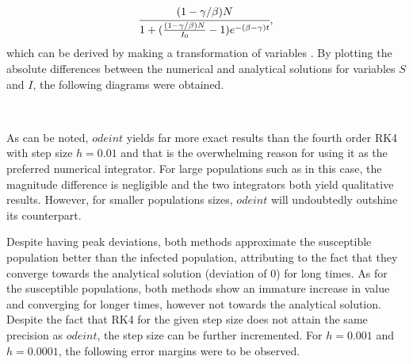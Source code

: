 \documentclass[12pt]{article}
\begin{document}
\begin{equation}
\cfrac{(1-\gamma/\beta)N}{1+(\frac{(1-\gamma/\beta)N}{I_0}-1)
e^{-(\beta-\gamma)t}},  
\end{equation}
which can be derived by making a transformation of variables \cite{levin}.
By plotting the absolute differences between the numerical and analytical solutions for variables $S$ and $I$, the following diagrams were obtained.

\begin{figure*}[ht!]
\begin{center}
   \\
   \caption{\label{workflow} (a) Error margin for $odeint$ (b) Error margin for  RK4 - $h = 0.01$}
\end{center}
\end{figure*}
\noindent As can be noted, $odeint$ yields far more exact results than the fourth order RK4 with step size $h = 0.01$ and that is the overwhelming reason for using it as the preferred numerical integrator. For large populations such as in this case, the magnitude difference is negligible and the two integrators both yield qualitative results. However, for smaller populations sizes, $odeint$ will undoubtedly outshine its counterpart. 

Despite having peak deviations, both methods approximate the susceptible population better than the infected population, attributing to the fact that they converge towards the analytical solution (deviation of 0) for long times. 
\newpage 
\noindent As for the susceptible populations, both methods show an immature increase in value and converging for longer times, however not towards the analytical solution. Despite the fact that RK4 for the given step size does not attain the same precision as $odeint$, the step size can be further incremented. For $h = 0.001$ and $h = 0.0001$, the following error margins were to be observed.
\begin{figure*}[ht!]
\begin{center}
   \\
   \caption{\label{workflow} (a) RK4 - $h = 0.0001$ (b) RK4 - $h = 0.001$}
\end{center}
\end{figure*}
\end{document}
